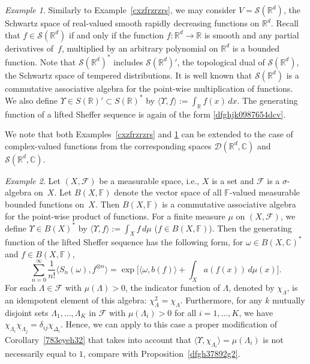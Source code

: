 \documentclass[12pt]{article}
\theoremstyle{remark}
\theoremstyle{remark}
\newtheorem{example}{Example}
\theoremstyle{remark}
\begin{document}
\begin{example}\label{fxdtsts6iu} Similarly to Example~\ref{cxzfrzrzrs}, we may consider $V=\mathcal S(\mathbb R^d)$, the Schwartz space of real-valued smooth rapidly decreasing functions on $\mathbb R^d$. Recall that $f\in \mathcal S(\mathbb R^d)$ if and only if the function $f:\mathbb R^d\to \mathbb R$ is smooth and any  partial derivatives of~$f$, multiplied by an arbitrary polynomial on $\mathbb R^d$ is a bounded function.  Note that $\mathcal S(\mathbb R^d)^*$ includes $\mathcal S(\mathbb R^d)'$, the topological dual of $\mathcal S(\mathbb R^d)$, the Schwartz space of tempered distributions. It is well known that $\mathcal S(\mathbb R^d)$ is a commutative associative algebra for the point-wise multiplication of functions. We also define $\Upsilon\in S(\mathbb R)'\subset S(\mathbb R)^*$ by 
$\langle \Upsilon,f\rangle:=\int_{\mathbb R}f(x)\,dx$. The generating function of a lifted Sheffer sequence is again of the form \eqref{dfghjk0987654dcv}. \end{example}


We note that both Examples~\ref{cxzfrzrzrs} and \ref{fxdtsts6iu} can be extended to the case of complex-valued functions from the corresponding spaces $\mathcal D(\mathbb R^d,\mathbb C)$ and  
$\mathcal S(\mathbb R^d,\mathbb C)$. 

\begin{example}Let $(X,\mathcal F)$ be a measurable  space, i.e., $X$ is a set and $\mathcal F$ is a $\sigma$-algebra on~$X$. Let $B(X,\mathbb F)$ denote the vector space of all $\mathbb F$-valued measurable bounded functions on~$X$. Then $B(X,\mathbb F)$ is a commutative associative algebra for the point-wise product of functions. For a finite measure $\mu$ on $(X,\mathcal F)$, we define $\Upsilon\in B(X)^*$ by $\langle \Upsilon,f\rangle:=\int_Xf\,d\mu$ ($f\in B(X,\mathbb F)$).
Then the generating function of the lifted Sheffer sequence has the following form, for $\omega\in B(X,\mathbb C)^*$ and $f\in B(X,\mathbb F)$, 
\begin{equation*}\sum_{n=0}^\infty\frac1{n!}\langle S_n(\omega),f^{\otimes n}\rangle=\exp\bigg[\langle\omega,b(f)\rangle+\int_Xa(f(x))\,d\mu (x)\bigg].\end{equation*}
For each $\Lambda\in\mathcal F$ with $\mu(\Lambda)>0$, the indicator function of $\Lambda$, denoted by $\chi_\Lambda$, is an idempotent element of this algebra: $\chi_\Lambda^2=\chi_\Lambda$. Furthermore, for any $k$ mutually disjoint sets $\Lambda_1,\dots,\Lambda_K$  in $\mathcal F$ with $\mu(\Lambda_i)>0$ for all $i=1,\dots,K$, we have 
$\chi_{\Lambda_i}\chi_{\Lambda_j}=\delta_{ij}\chi_{\Delta_i}$.
Hence, we can apply to this case a proper modification of Corollary~\ref{783eyeh32} that takes into account that $\langle \Upsilon,\chi_{\Lambda_i}\rangle=\mu(\Lambda_i)$ is not necessarily equal to $1$, compare with Proposition~\ref{dfgh37892g2}.
\end{example}
\end{document}
